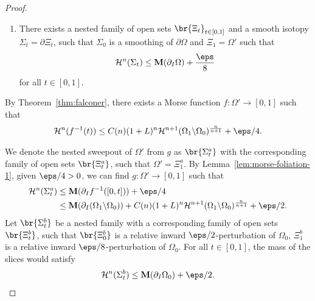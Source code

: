 \begin{lemma}
\begin{proof}
\begin{enumerate}
            \item[(b)] There exists a nested family of open sets $\br{\Xi_t}_{t \in [0, 1]}$ and a smooth isotopy $\Sigma_t = \partial\Xi_t$, such that $\Sigma_0$ is a smoothing of $\partial\Omega$ and $\Xi_1 = \Omega'$ such that
            \begin{equation*}
                \mathcal{H}^n(\Sigma_t) \leq \mathbf{M}(\partial_I\Omega) + \frac{\eps}{8}
            \end{equation*}
            for all $t \in [0, 1]$.
        \end{enumerate}
        By Theorem~\ref{thm:falconer}, there exists a Morse function $f: \Omega' \to [0, 1]$ such that
        \begin{equation*}
        \begin{split}
            \mathcal{H}^n(f^{-1}(t)) \leq C(n)(1 + L)^n\mathcal{H}^{n+1}(\Omega_1\backslash\Omega_0)^{\frac{n}{n + 1}} + \eps/4.
        \end{split}
        \end{equation*}

        We denote the nested sweepout of $\Omega'$ from $g$ as $\br{\Sigma_t^a}$ with the corresponding family of open sets $\br{\Xi_t^a}$, such that $\Omega' = \Xi_1^a$. By Lemma~\ref{lem:morse-foliation-1}, given $\eps/4 > 0$, we can find $g: \Omega' \to [0, 1]$ such that
        \begin{equation}\label{eq:sigma-a-t}
            \begin{split}
                \mathcal{H}^n(\Sigma_t^a) &\leq \mathbf{M}(\partial_I f^{-1}([0, t])) + \eps/4\\
                &\leq \mathbf{M}(\partial_I(\Omega_1\backslash\Omega_0)) + C(n)(1 + L)^n\mathcal{H}^{n+1}(\Omega_1\backslash\Omega_0)^{\frac{n}{n + 1}} + \eps/2.
            \end{split}
        \end{equation}
        Let $\br{\Sigma_t^b}$ be a nested family with a corresponding family of open sets $\br{\Xi_t^b}$, such that $\br{\Xi_0^b}$ is a relative inward $\eps/2$-perturbation of $\Omega_0$, $\Xi_1^b$ is a relative inward $\eps/8$-perturbation of $\Omega_0$. For all $t \in [0, 1]$, the mass of the slices would satisfy
        \begin{equation}\label{eq:sigma-b-t}
            \mathcal{H}^n(\Sigma_t^b) \leq \mathbf{M}(\partial_I\Omega_0) + \eps/2.
        \end{equation}


\end{proof}
\end{lemma}
